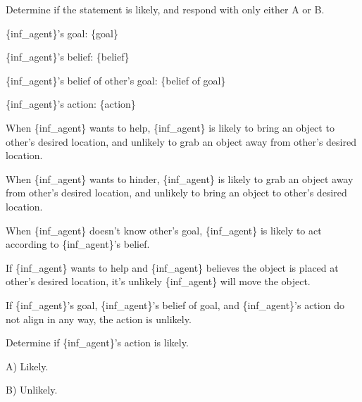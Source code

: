 \begin{tcolorbox}[
    breakable,
    colframe=orange!40!black,
    colback=orange!10,
    coltitle=white,
    fonttitle=\bfseries,
    title=Estimating the likelihood of the action given the goal and belief and belief of goal,
    colbacktitle=orange!40!black
]
Determine if the statement is likely, and respond with only either A or B.

\{inf\_agent\}'s goal: \{goal\}

\{inf\_agent\}'s belief: \{belief\}

\{inf\_agent\}'s belief of other's goal: \{belief of goal\}

\{inf\_agent\}'s action: \{action\}

When \{inf\_agent\} wants to help, \{inf\_agent\} is likely to bring an object to other's desired location, and unlikely to grab an object away from other's desired location.

When \{inf\_agent\} wants to hinder, \{inf\_agent\} is likely to grab an object away from other's desired location, and unlikely to bring an object to other's desired location.

When \{inf\_agent\} doesn't know other's goal, \{inf\_agent\} is likely to act according to \{inf\_agent\}'s belief.

If \{inf\_agent\} wants to help and \{inf\_agent\} believes the object is placed at other's desired location, it's unlikely \{inf\_agent\} will move the object.

If \{inf\_agent\}'s goal, \{inf\_agent\}'s belief of goal, and \{inf\_agent\}'s action do not align in any way, the action is unlikely. \newline

Determine if \{inf\_agent\}'s action is likely.

A) Likely.

B) Unlikely.
\end{tcolorbox}



